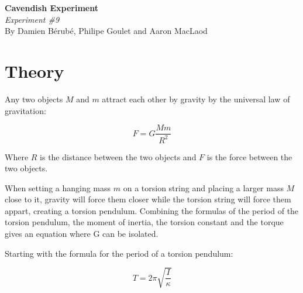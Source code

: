 \documentclass[12pt]{article}
\begin{document}
\begin{center}
    \large\textbf{Cavendish Experiment}\\
\normalsize \textit{Experiment \#9}\\
    By Damien Bérubé, Philipe Goulet and Aaron MacLaod
\end{center}
 \section*{Theory}

    Any two objects $M$ and $m$ attract each other by gravity by the universal law of gravitation:

    \begin{equation}
        F=G\frac{Mm}{R^2}
    \end{equation}

    Where $R$ is the distance between the two objects and $F$ is the force between the two objects.

    When setting a hanging mass $m$ on a torsion string and placing a larger mass $M$ close to it, gravity will force them closer while the torsion string will force them appart, creating a torsion pendulum. Combining the formulas of the period of the torsion pendulum, the moment of inertia, the torsion constant and the torque gives an equation where G can be isolated.


    Starting with the formula for the period of a torsion pendulum:

    \begin{equation}
        T=2\pi\sqrt{\frac{I}{\kappa}} \label{eq:torsion}
    \end{equation}
\end{document}
